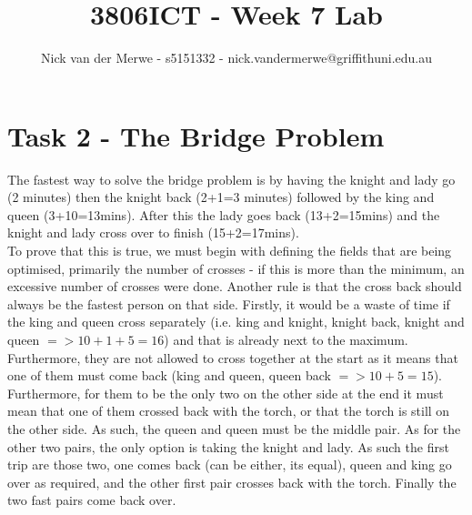 \documentclass{article}
\title{3806ICT - Week 7 Lab}
\author{Nick van der Merwe - s5151332 - nick.vandermerwe@griffithuni.edu.au}
\newcommand\tab[1][1cm]{\hspace*{#1}}
\begin{document}
\maketitle

\section*{Task 2 - The Bridge Problem}
The fastest way to solve the bridge problem is by 
having the knight and lady go (2 minutes) then the knight back
(2+1=3 minutes) followed by the king and queen (3+10=13mins). 
After this the lady goes back (13+2=15mins) and the knight
and lady cross over to finish (15+2=17mins).
\\
\tab To prove that this is true, we must begin with defining the fields that are
being optimised, primarily the number of crosses - if this is more than the minimum, an
excessive number of crosses were done. Another rule is that the cross back
should always be the fastest person on that side. Firstly, it would be a waste
of time if the king and queen cross separately (i.e. king and knight, knight
back, knight and queen $=> 10+1+5=16$) and that is already next to the maximum.
Furthermore, they are not allowed to cross together at the start as it means
that one of them must come back (king and queen, queen back $=>10+5=15$).
Furthermore, for them to be the only two on the other side at the end it must
mean that one of them crossed back with the torch, or that the torch is still on
the other side. As such, the queen and queen must be the middle pair. As for the
other two pairs, the only option is taking the knight and lady. As such the
first trip are those two, one comes back (can be either, its equal), queen and
king go over as required, and the other first pair crosses back with the torch.
Finally the two fast pairs come back over.
\end{document}
